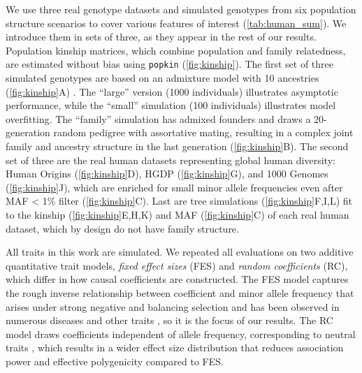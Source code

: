 \documentclass[11pt]{article}
\begin{document}
\begin{linenumbers}
We use three real genotype datasets and simulated genotypes from six population structure scenarios to cover various features of interest (\cref{tab:human_sum}).
We introduce them in sets of three, as they appear in the rest of our results.
Population kinship matrices, which combine population and family relatedness, are estimated without bias using \texttt{popkin} \citep{ochoa_estimating_2021} (\cref{fig:kinship}).
The first set of three simulated genotypes are based on an admixture model with 10 ancestries (\cref{fig:kinship}A) \citep{ochoa_estimating_2021, gopalan_scaling_2016, cabreros_likelihood-free_2019}.
The ``large'' version (1000 individuals) illustrates asymptotic performance, while the ``small'' simulation (100 individuals) illustrates model overfitting.
The ``family'' simulation has admixed founders and draws a 20-generation random pedigree with assortative mating, resulting in a complex joint family and ancestry structure in the last generation (\cref{fig:kinship}B).
The second set of three are the real human datasets representing global human diversity: Human Origins (\cref{fig:kinship}D), HGDP (\cref{fig:kinship}G), and 1000 Genomes (\cref{fig:kinship}J), which are enriched for small minor allele frequencies even after MAF < 1\% filter (\cref{fig:kinship}C).
Last are tree simulations (\cref{fig:kinship}F,I,L) fit to the kinship (\cref{fig:kinship}E,H,K) and MAF (\cref{fig:kinship}C) of each real human dataset, which by design do not have family structure.

All traits in this work are simulated.
We repeated all evaluations on two additive quantitative trait models, \textit{fixed effect sizes} (FES) and \textit{random coefficients} (RC), which differ in how causal coefficients are constructed.
The FES model captures the rough inverse relationship between coefficient and minor allele frequency that arises under strong negative and balancing selection and has been observed in numerous diseases and other traits \citep{park_distribution_2011, zeng_signatures_2018, simons_population_2018, oconnor_extreme_2019}, so it is the focus of our results.
The RC model draws coefficients independent of allele frequency, corresponding to neutral traits \citep{zeng_signatures_2018, simons_population_2018}, which results in a wider effect size distribution that reduces association power and effective polygenicity compared to FES.


\end{linenumbers}
\end{document}
